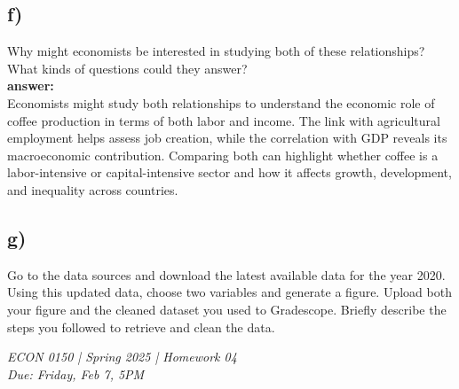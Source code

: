 \documentclass[12pt]{article}
\begin{document}
\subsection*{f)} Why might economists be interested in studying both of these relationships? What kinds of questions could they answer?\\

\textbf{answer:}\\
Economists might study both relationships to understand the economic role of coffee production in terms of both labor and income. The link with agricultural employment helps assess job creation, while the correlation with GDP reveals its macroeconomic contribution. Comparing both can highlight whether coffee is a labor-intensive or capital-intensive sector and how it affects growth, development, and inequality across countries.

\subsection*{g)} Go to the data sources and download the latest available data for the year 2020. Using this updated data, choose two variables and generate a figure. Upload both your figure and the cleaned dataset you used to Gradescope. Briefly describe the steps you followed to retrieve and clean the data.


\vfill

\noindent\hrulefill

\noindent \small{\textit{ECON 0150 | Spring 2025 | Homework 04}} \\
\textit{Due: Friday, Feb 7, 5PM}
\end{document}
